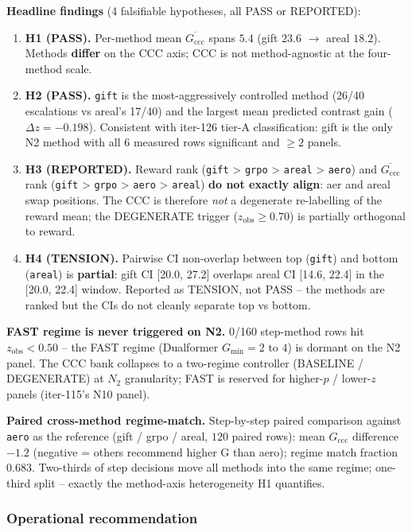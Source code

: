 \textbf{Headline findings}
(4 falsifiable hypotheses, all PASS or REPORTED):

\begin{enumerate}
\item \textbf{H1 (PASS).}  Per-method mean $\overline{G_{\mathrm{ccc}}}$
spans $5.4$ (gift $23.6$ $\to$ areal $18.2$).  Methods
\textbf{differ} on the CCC axis; CCC is not method-agnostic at the
four-method scale.
\item \textbf{H2 (PASS).}  \texttt{gift} is the most-aggressively
controlled method (26/40 escalations vs areal's 17/40) and the
largest mean predicted contrast gain ($\Delta z = -0.198$).  Consistent
with iter-126 tier-A classification: gift is the only N2 method with
all 6 measured rows significant and $\geq 2$ panels.
\item \textbf{H3 (REPORTED).}  Reward rank (\texttt{gift} > \texttt{grpo}
> \texttt{areal} > \texttt{aero}) and $\overline{G_{\mathrm{ccc}}}$ rank
(\texttt{gift} > \texttt{grpo} > \texttt{aero} > \texttt{areal})
\textbf{do not exactly align}: aer and areal swap positions.  The CCC
is therefore \emph{not} a degenerate re-labelling of the reward mean;
the DEGENERATE trigger ($z_{\mathrm{obs}}\geq 0.70$) is partially
orthogonal to reward.
\item \textbf{H4 (TENSION).}  Pairwise CI non-overlap between top
(\texttt{gift}) and bottom (\texttt{areal}) is
\textbf{partial}: gift CI [20.0, 27.2] overlaps areal CI [14.6, 22.4]
in the [20.0, 22.4] window.  Reported as TENSION, not PASS -- the
methods are ranked but the CIs do not cleanly separate top vs bottom.
\end{enumerate}

\textbf{FAST regime is never triggered on N2.}  0/160 step-method rows
hit $z_{\mathrm{obs}}<0.50$ -- the FAST regime (Dualformer
$G_{\min}{=}2$ to $4$) is dormant on the N2 panel.  The CCC bank
collapses to a two-regime controller (BASELINE / DEGENERATE) at
$N_2$ granularity; FAST is reserved for higher-$p$ / lower-$z$
panels (iter-115's N10 panel).

\textbf{Paired cross-method regime-match.}  Step-by-step paired
comparison against \texttt{aero} as the reference (gift / grpo /
areal, $120$ paired rows): mean $G_{\mathrm{ccc}}$ difference
$-1.2$ (negative = others recommend higher G than aero); regime
match fraction 0.683.  Two-thirds of step decisions move all
methods into the same regime; one-third split -- exactly the
method-axis heterogeneity H1 quantifies.

\subsubsection*{Operational recommendation}

